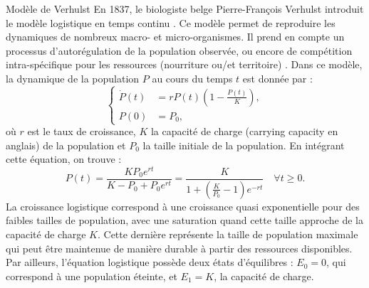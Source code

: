 	\begin{encadre2}{Modèle de Verhulst}
	  \label{logistique}
	  En 1837, le biologiste belge Pierre-François Verhulst introduit le  modèle logistique en temps continu \citep{Verhulst1838} . Ce modèle permet de reproduire les dynamiques de nombreux macro- et micro-organismes. Il prend en compte  un processus d’autorégulation de la population observée, ou encore de compétition intra-spécifique pour les ressources (nourriture ou/et territoire) \citep{Brauer2012}.
	  Dans ce modèle, la dynamique de  la population  $P$ au cours du temps $t$ est donnée par :
	  \begin{equation*}
	    \left\{
	      \begin{aligned}
	        \dot{P}(t)&= rP(t) \left(1 - \frac{P(t)}{K}\right),\\
	        P(0)&= P_0,
	      \end{aligned}
	    \right.
	  \end{equation*}
où $r$ est le taux de croissance, $K$ la capacité de charge (\og carrying capacity \fg{} en anglais)  de la population et $P_0$ la taille initiale de la population. En intégrant cette équation, on trouve :
	  \begin{equation*}
	        P(t) = \frac{KP_0e^{rt} }{ K - P_0+ P_0 e^{rt}} = \frac{K}{1+\left(\frac{K}{P_0}-1\right) e^{-rt}} \quad  
	        \forall t \geqslant 0.
	  \end{equation*}
	 	La croissance logistique correspond à une croissance quasi exponentielle pour des faibles tailles de population, avec une saturation quand cette taille approche de la capacité de charge $K$. Cette dernière représente la taille de population maximale qui peut être maintenue de manière durable à partir des ressources disponibles.  Par ailleurs, l'équation logistique possède deux états d'équilibres :  $E_0 = 0$, qui correspond à une population éteinte,  et $E_1 = K$, la capacité de charge.
	\end{encadre2} 
	  
